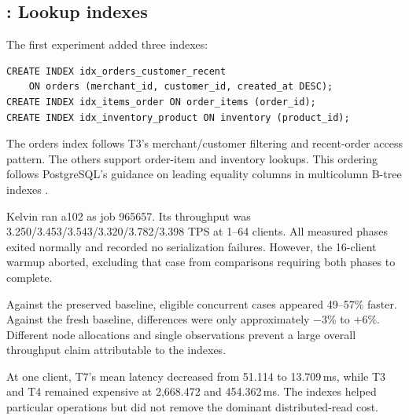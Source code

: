 \subsection{: Lookup indexes}
\label{sec:a102}
The first experiment added three indexes:
\begin{lstlisting}
CREATE INDEX idx_orders_customer_recent
    ON orders (merchant_id, customer_id, created_at DESC);
CREATE INDEX idx_items_order ON order_items (order_id);
CREATE INDEX idx_inventory_product ON inventory (product_id);
\end{lstlisting}
The orders index follows T3's merchant/customer filtering and recent-order
access pattern. The others support order-item and inventory lookups. This
ordering follows PostgreSQL's guidance on leading equality columns in
multicolumn B-tree indexes \citep{pg-multicolumn}.

Kelvin ran a102 as job 965657. Its throughput was
3.250/3.453/3.543/3.320/3.782/3.398 TPS at 1--64 clients. All measured phases
exited normally and recorded no serialization failures. However, the 16-client
warmup aborted, excluding that case from comparisons requiring both phases
to complete.

Against the preserved baseline, eligible concurrent cases appeared 49--57\%
faster. Against the fresh baseline, differences were only approximately
$-3\%$ to $+6\%$. Different node allocations and single observations prevent
a large overall throughput claim attributable to the indexes.

At one client, T7's mean latency decreased from 51.114 to 13.709\,ms, while
T3 and T4 remained expensive at 2,668.472 and 454.362\,ms. The indexes helped
particular operations but did not remove the dominant distributed-read cost.
